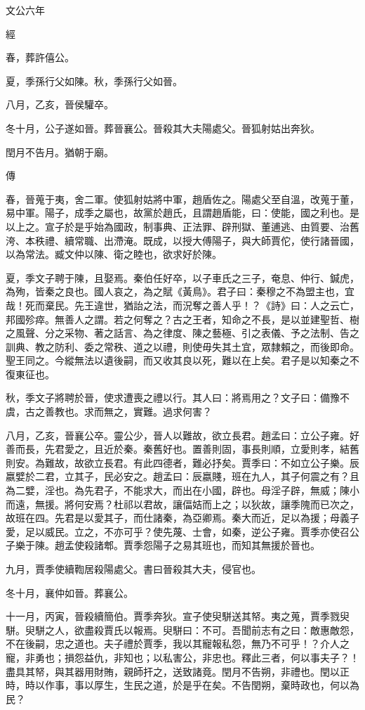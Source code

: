 \documentclass[fontset = none]{ctexart}
\begin{document}
文公六年


經



春，葬許僖公。

夏，季孫行父如陳。秋，季孫行父如晉。

八月，乙亥，晉侯驩卒。

冬十月，公子遂如晉。葬晉襄公。晉殺其大夫陽處父。晉狐射姑出奔狄。

閏月不告月。猶朝于廟。

傳



春，晉蒐于夷，舍二軍。使狐射姑將中軍，趙盾佐之。陽處父至自溫，改蒐于董，易中軍。陽子，成季之屬也，故黨於趙氏，且謂趙盾能，曰：使能，國之利也。是以上之。宣子於是乎始為國政，制事典、正法罪、辟刑獄、董逋逃、由質要、治舊洿、本秩禮、續常職、出滯淹。既成，以授大傅陽子，與大師賈佗，使行諸晉國，以為常法。臧文仲以陳、衛之睦也，欲求好於陳。

夏，季文子聘于陳，且娶焉。秦伯任好卒，以子車氏之三子，奄息、仲行、鍼虎，為殉，皆秦之良也。國人哀之，為之賦《黃鳥》。君子曰：秦穆之不為盟主也，宜哉！死而棄民。先王違世，猶詒之法，而況奪之善人乎！？《詩》曰：人之云亡，邦國殄瘁。無善人之謂。若之何奪之？古之王者，知命之不長，是以並建聖哲、樹之風聲、分之采物、著之話言、為之律度、陳之藝極、引之表儀、予之法制、告之訓典、教之防利、委之常秩、道之以禮，則使毋失其土宜，眾隸賴之，而後即命。聖王同之。今縱無法以遺後嗣，而又收其良以死，難以在上矣。君子是以知秦之不復東征也。

秋，季文子將聘於晉，使求遭喪之禮以行。其人曰：將焉用之？文子曰：備豫不虞，古之善教也。求而無之，實難。過求何害？

八月，乙亥，晉襄公卒。靈公少，晉人以難故，欲立長君。趙孟曰：立公子雍。好善而長，先君愛之，且近於秦。秦舊好也。置善則固，事長則順，立愛則孝，結舊則安。為難故，故欲立長君。有此四德者，難必抒矣。賈季曰：不如立公子樂。辰嬴嬖於二君，立其子，民必安之。趙孟曰：辰嬴賤，班在九人，其子何震之有？且為二嬖，淫也。為先君子，不能求大，而出在小國，辟也。母淫子辟，無威；陳小而遠，無援。將何安焉？杜祁以君故，讓偪姞而上之；以狄故，讓季隗而已次之，故班在四。先君是以愛其子，而仕諸秦，為亞卿焉。秦大而近，足以為援；母義子愛，足以威民。立之，不亦可乎？使先蔑、士會，如秦，逆公子雍。賈季亦使召公子樂于陳。趙孟使殺諸郫。賈季怨陽子之易其班也，而知其無援於晉也。

九月，賈季使續鞫居殺陽處父。書曰晉殺其大夫，侵官也。

冬十月，襄仲如晉。葬襄公。

十一月，丙寅，晉殺續簡伯。賈季奔狄。宣子使臾駢送其帑。夷之蒐，賈季戮臾駢。臾駢之人，欲盡殺賈氏以報焉。臾駢曰：不可。吾聞前志有之曰：敵惠敵怨，不在後嗣，忠之道也。夫子禮於賈季，我以其寵報私怨，無乃不可乎！？介人之寵，非勇也；損怨益仇，非知也；以私害公，非忠也。釋此三者，何以事夫子？！盡具其帑，與其器用財賄，親師扞之，送致諸竟。閏月不告朔，非禮也。閏以正時，時以作事，事以厚生，生民之道，於是乎在矣。不告閏朔，棄時政也，何以為民？
\end{document}
